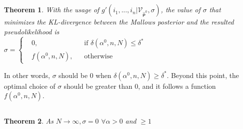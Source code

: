 \documentclass[11pt, oneside]{article}   	%
\newtheorem{theorem}{Theorem}[subsection]
\begin{document}
\subsection{ }
\begin{theorem}
With the usage of  $g'(i_1, ...,i_n|\mathcal{V}_{\hat{\bm{\rho}}^0}, \sigma)$, the value of $\sigma$ that minimizes the KL-divergence between the Mallows posterior and the resulted pseudolikelihood is\\
 $
\sigma = \left \{
\begin{aligned}
&0, && \text{if } \delta(\alpha^0,n,N)\leq \delta ^{*} \\
&f(\alpha^0, n,N), && \text{otherwise}
\end{aligned} \right.
$
\end{theorem}

In other words, $\sigma$ should be 0 when $\delta(\alpha^0,n,N) \geq \delta^*$. Beyond this point, the optimal choice of $\sigma$ should be greater than 0, and it follows a function $f(\alpha^0,n,N)$.

\subsection{ }
\begin{theorem}
	As $N \rightarrow \infty,\sigma = 0$  $ \forall \alpha >0$ and $\geq 1$
\end{theorem}
\end{document}
